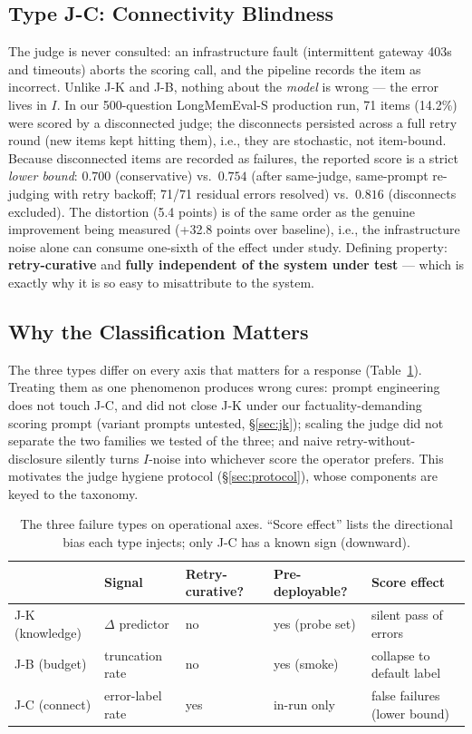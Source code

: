 \documentclass[11pt]{article}
\begin{document}
\subsection{Type J-C: Connectivity Blindness}
\label{sec:jc}

The judge is never consulted: an infrastructure fault (intermittent gateway 403s and
timeouts) aborts the scoring call, and the pipeline records the item as incorrect.
Unlike J-K and J-B, nothing about the \emph{model} is wrong --- the error lives in
$I$. In our 500-question LongMemEval-S production run, 71 items (14.2\%) were scored
by a disconnected judge; the disconnects persisted across a full retry round
(new items kept hitting them), i.e., they are stochastic, not item-bound. Because
disconnected items are recorded as failures, the reported score is a strict
\emph{lower bound}: $0.700$ (conservative) vs.\ $0.754$ (after same-judge,
same-prompt re-judging with retry backoff; 71/71 residual errors resolved) vs.\
$0.816$ (disconnects excluded). The distortion (5.4 points) is of the same order as
the genuine improvement being measured (+32.8 points over baseline), i.e., the
infrastructure noise alone can consume one-sixth of the effect under study. Defining
property: \textbf{retry-curative} and \textbf{fully independent of the system under
test} --- which is exactly why it is so easy to misattribute to the system.

\subsection{Why the Classification Matters}
\label{sec:why}

The three types differ on every axis that matters for a response
(Table~\ref{tab:axes}). Treating them as one phenomenon produces wrong cures:
prompt engineering does not touch J-C, and did not close J-K under our
factuality-demanding scoring prompt (variant prompts untested, \S\ref{sec:jk});
scaling the judge did not separate the two families we tested
of the three; and naive retry-without-disclosure silently turns $I$-noise into
whichever score the operator prefers. This motivates the judge hygiene protocol
(\S\ref{sec:protocol}), whose components are keyed to the taxonomy.

\begin{table}[t]
\centering
\small
\begin{tabular}{@{}lllll@{}}
\toprule
& Signal & Retry-curative? & Pre-deployable? & Score effect \\
\midrule
J-K (knowledge) & $\Delta$ predictor & no & yes (probe set) & silent pass of errors \\
J-B (budget)    & truncation rate & no & yes (smoke) & collapse to default label \\
J-C (connect)   & error-label rate & yes & in-run only & false failures (lower bound) \\
\bottomrule
\end{tabular}
\caption{The three failure types on operational axes. ``Score effect'' lists the
directional bias each type injects; only J-C has a known sign (downward).}
\label{tab:axes}
\end{table}
\end{document}
